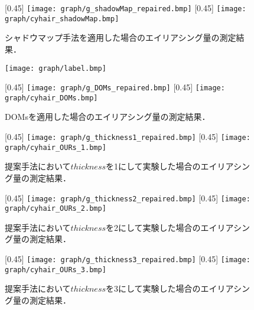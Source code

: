 %
\begin{figure}[htb]
        [0.45\linewidth]
            {\texttt{[image: graph/g\_shadowMap\_repaired.bmp]}}
        [0.45\linewidth]
            {\texttt{[image: graph/cyhair\_shadowMap.bmp]}}

    \caption{シャドウマップ手法を適用した場合のエイリアシング量の測定結果．}
    \label{fig:result_shadow_map}
\end{figure}
%
\newpage
\begin{figure}[htb]
    \centering
    \texttt{[image: graph/label.bmp]}
\end{figure}
%
\begin{figure}[htb]
        [0.45\linewidth]
            {\texttt{[image: graph/g\_DOMs\_repaired.bmp]}}
        [0.45\linewidth]
            {\texttt{[image: graph/cyhair\_DOMs.bmp]}}

    \caption{DOMsを適用した場合のエイリアシング量の測定結果．}
    \label{fig:result_doms}
\end{figure}
%
\begin{figure}[htb]
        [0.45\linewidth]
            {\texttt{[image: graph/g\_thickness1\_repaired.bmp]}}
        [0.45\linewidth]
            {\texttt{[image: graph/cyhair\_OURs\_1.bmp]}}

    \caption{提案手法において$thickness$を1にして実験した場合のエイリアシング量の測定結果．}
    \label{fig:result_ours1}
\end{figure}
%
\begin{figure}[htb]
        [0.45\linewidth]
            {\texttt{[image: graph/g\_thickness2\_repaired.bmp]}}
        [0.45\linewidth]
            {\texttt{[image: graph/cyhair\_OURs\_2.bmp]}}

    \caption{提案手法において$thickness$を2にして実験した場合のエイリアシング量の測定結果．}
    \label{fig:result_ours2}
\end{figure}
%
\begin{figure}[htb]
        [0.45\linewidth]
            {\texttt{[image: graph/g\_thickness3\_repaired.bmp]}}
        [0.45\linewidth]
            {\texttt{[image: graph/cyhair\_OURs\_3.bmp]}}

    \caption{提案手法において$thickness$を3にして実験した場合のエイリアシング量の測定結果．}
    \label{fig:result_ours3}
\end{figure}